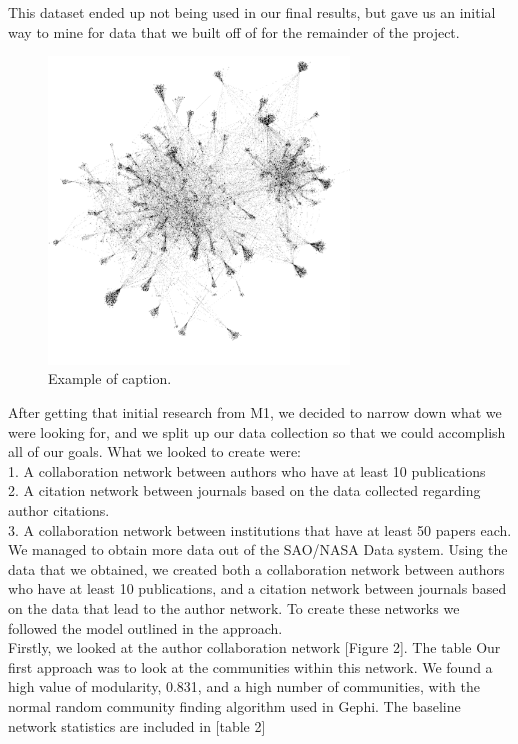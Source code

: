 \documentclass[times, 10pt,twocolumn]{article}
\begin{document}
This dataset ended up not being used in our final results, but gave us an initial way to mine for data that we built off of for the remainder of the project.

\begin{figure}[h]
   \includegraphics[width=8cm]{figure1.png}
   \caption{Example of caption.}
\end{figure}

After getting that initial research from M1, we decided to narrow down what we were looking for, and we split up our data collection so that we could accomplish all of our goals. What we looked to create were: \\
1. A collaboration network between authors who have at least 10 publications \\
2. A citation network between journals based on the data collected regarding author citations.\\
3. A collaboration network between institutions that have at least 50 papers each.\\

We managed to obtain more data out of the SAO/NASA Data system. Using the data that we obtained, we created both a collaboration network between authors who have at least 10 publications, and a citation network between journals based on the data that lead to the author network. To create these networks we followed the model outlined in the approach.  \\

Firstly, we looked at the author collaboration network [Figure 2]. The table Our first approach was to look at the communities within this network. We found a high value of modularity, 0.831, and a high number of communities, with the normal random community finding algorithm used in Gephi. The baseline network statistics are included in [table 2]
\end{document}
